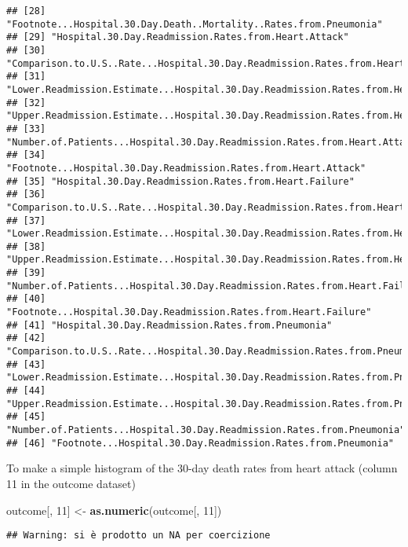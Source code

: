 \documentclass[]{article}
\newenvironment{Shaded}{\begin{snugshade}}{\end{snugshade}}
\newcommand{\KeywordTok}[1]{\textcolor[rgb]{0.13,0.29,0.53}{\textbf{#1}}}
\newcommand{\DecValTok}[1]{\textcolor[rgb]{0.00,0.00,0.81}{#1}}
\newcommand{\StringTok}[1]{\textcolor[rgb]{0.31,0.60,0.02}{#1}}
\newcommand{\NormalTok}[1]{#1}
\begin{document}
\begin{verbatim}
## [28] "Footnote...Hospital.30.Day.Death..Mortality..Rates.from.Pneumonia"                    
## [29] "Hospital.30.Day.Readmission.Rates.from.Heart.Attack"                                  
## [30] "Comparison.to.U.S..Rate...Hospital.30.Day.Readmission.Rates.from.Heart.Attack"        
## [31] "Lower.Readmission.Estimate...Hospital.30.Day.Readmission.Rates.from.Heart.Attack"     
## [32] "Upper.Readmission.Estimate...Hospital.30.Day.Readmission.Rates.from.Heart.Attack"     
## [33] "Number.of.Patients...Hospital.30.Day.Readmission.Rates.from.Heart.Attack"             
## [34] "Footnote...Hospital.30.Day.Readmission.Rates.from.Heart.Attack"                       
## [35] "Hospital.30.Day.Readmission.Rates.from.Heart.Failure"                                 
## [36] "Comparison.to.U.S..Rate...Hospital.30.Day.Readmission.Rates.from.Heart.Failure"       
## [37] "Lower.Readmission.Estimate...Hospital.30.Day.Readmission.Rates.from.Heart.Failure"    
## [38] "Upper.Readmission.Estimate...Hospital.30.Day.Readmission.Rates.from.Heart.Failure"    
## [39] "Number.of.Patients...Hospital.30.Day.Readmission.Rates.from.Heart.Failure"            
## [40] "Footnote...Hospital.30.Day.Readmission.Rates.from.Heart.Failure"                      
## [41] "Hospital.30.Day.Readmission.Rates.from.Pneumonia"                                     
## [42] "Comparison.to.U.S..Rate...Hospital.30.Day.Readmission.Rates.from.Pneumonia"           
## [43] "Lower.Readmission.Estimate...Hospital.30.Day.Readmission.Rates.from.Pneumonia"        
## [44] "Upper.Readmission.Estimate...Hospital.30.Day.Readmission.Rates.from.Pneumonia"        
## [45] "Number.of.Patients...Hospital.30.Day.Readmission.Rates.from.Pneumonia"                
## [46] "Footnote...Hospital.30.Day.Readmission.Rates.from.Pneumonia"
\end{verbatim}

To make a simple histogram of the 30-day death rates from heart attack
(column 11 in the outcome dataset)

\begin{Shaded}
\begin{Highlighting}[]
\NormalTok{outcome[, }\DecValTok{11}\NormalTok{] <-}\StringTok{ }\KeywordTok{as.numeric}\NormalTok{(outcome[, }\DecValTok{11}\NormalTok{])}
\end{Highlighting}
\end{Shaded}

\begin{verbatim}
## Warning: si è prodotto un NA per coercizione
\end{verbatim}
\end{document}
